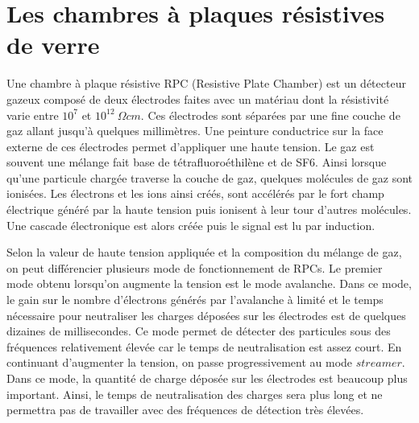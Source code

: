 \section{Les chambres à plaques résistives de verre}
\label{sec.grpc}
Une chambre à plaque résistive RPC (Resistive Plate Chamber) est un détecteur gazeux composé de deux électrodes faites avec un matériau dont la résistivité varie entre $10^7$ et $10^{12}~\Omega cm$. Ces électrodes sont séparées par une fine couche de gaz allant jusqu'à quelques millimètres. Une peinture conductrice sur la face externe de ces électrodes permet d'appliquer une haute tension. Le gaz est souvent une mélange fait base de tétrafluoroéthilène et de SF6. Ainsi lorsque qu'une particule chargée traverse la couche de gaz, quelques molécules de gaz sont ionisées. Les électrons et les ions ainsi créés, sont accélérés par le fort champ électrique généré par la haute tension puis ionisent à leur tour d'autres molécules. Une cascade électronique est alors créée puis le signal est lu par induction. 

Selon la valeur de haute tension appliquée et la composition du mélange de gaz, on peut différencier plusieurs mode de fonctionnement de RPCs. Le premier mode obtenu lorsqu'on augmente la tension est le mode avalanche. Dans ce mode, le gain sur le nombre d'électrons générés par l'avalanche à limité et le temps nécessaire pour neutraliser les charges déposées sur les électrodes est de quelques dizaines de millisecondes. Ce mode permet de détecter des particules sous des fréquences relativement élevée car le temps de neutralisation est assez court. En continuant d'augmenter la tension, on passe progressivement au mode $streamer$. Dans ce mode, la quantité de charge déposée sur les électrodes est beaucoup plus important. Ainsi, le temps de neutralisation des charges sera plus long et ne permettra pas de travailler avec des fréquences de détection très élevées.

